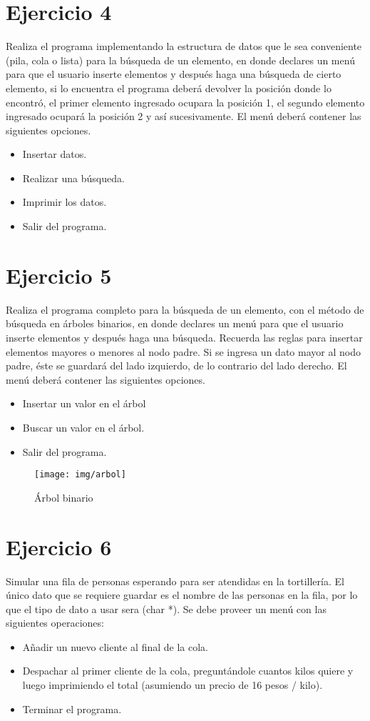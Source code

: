 \documentclass{article}
\begin{document}
	\section{\textbf{Ejercicio 4}}
	Realiza el programa implementando la estructura de datos que le sea conveniente (pila, cola o lista) para la búsqueda de un elemento, en donde declares un menú para que el usuario inserte elementos y después haga una búsqueda de cierto elemento, si lo encuentra el programa deberá devolver la posición donde lo encontró, el primer elemento ingresado ocupara la posición 1, el segundo elemento ingresado ocupará la posición 2 y así sucesivamente. El menú deberá contener las siguientes opciones.
	\begin{itemize}
		\item Insertar datos.
		\item Realizar una búsqueda.
		\item Imprimir los datos.
		\item Salir del programa.
	\end{itemize}
	
	\section{\textbf{Ejercicio 5}}
	Realiza el programa completo para la búsqueda de un elemento, con el método de búsqueda en árboles binarios,  
	en donde declares un menú para que el usuario inserte elementos y después haga una búsqueda.  
	Recuerda las reglas para insertar elementos mayores o menores al nodo padre. Si se ingresa un dato mayor al nodo padre, éste se guardará del lado izquierdo, de lo contrario del lado derecho. El menú deberá contener las siguientes opciones.
	\begin{itemize}
		\item Insertar un valor en el árbol
		\item Buscar un valor en el árbol.
		\item Salir del programa.
	\end{itemize}
	\begin{figure}[h]
		\centering
		\texttt{[image: img/arbol]}
		\caption{Árbol binario}
		\label{Fig:Arbol}
	\end{figure}
\section{\textbf{Ejercicio 6}}
Simular una fila de personas esperando para ser atendidas en la tortillería. El único dato que se requiere guardar es el nombre de las personas en la fila, por lo que el tipo de dato a usar sera (char *). Se debe proveer un menú con las siguientes operaciones:
\begin{itemize}
	\item Añadir un nuevo cliente al final de la cola.
	\item  Despachar al primer cliente de la cola, preguntándole cuantos kilos quiere y luego imprimiendo el total (asumiendo un precio de 16 pesos / kilo).
	\item Terminar el programa.
\end{itemize}
\end{document}
